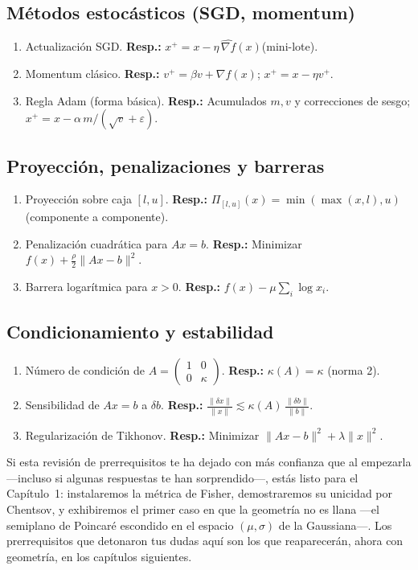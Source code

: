 	\subsection*{Métodos estocásticos (SGD, momentum)}
	\begin{enumerate}
		\item Actualización SGD. \textbf{Resp.:} $x^{+}=x-\eta\,\widehat{\nabla f}(x)$(mini-lote).
		\item Momentum clásico. \textbf{Resp.:} $v^{+}=\beta v+\nabla f(x)$; $x^{+}=x-\eta v^{+}$.
		\item Regla Adam (forma básica). \textbf{Resp.:} Acumulados $m,v$ y correcciones de sesgo; $x^{+}=x-\alpha\, m/ (\sqrt v+\varepsilon)$.
	\end{enumerate}
	
	\subsection*{Proyección, penalizaciones y barreras}
	\begin{enumerate}
		\item Proyección sobre caja $[l,u]$. \textbf{Resp.:} $\Pi_{[l,u]}(x)=\min(\max(x,l),u)$ (componente a componente).
		\item Penalización cuadrática para $Ax=b$. \textbf{Resp.:} Minimizar $f(x)+\tfrac{\rho}{2}\|Ax-b\|^2$.
		\item Barrera logarítmica para $x>0$. \textbf{Resp.:} $f(x)-\mu\sum_i \log x_i$.
	\end{enumerate}
	
	\subsection*{Condicionamiento y estabilidad}
	\begin{enumerate}
		\item Número de condición de $A=\begin{pmatrix}1&0\\0&\kappa\end{pmatrix}$. \textbf{Resp.:} $\kappa(A)=\kappa$ (norma 2).
		\item Sensibilidad de $Ax=b$ a $\delta b$. \textbf{Resp.:} $\frac{\|\delta x\|}{\|x\|}\lesssim \kappa(A)\,\frac{\|\delta b\|}{\|b\|}$.
		\item Regularización de Tikhonov. \textbf{Resp.:} Minimizar $\|Ax-b\|^2+\lambda\|x\|^2$.
	\end{enumerate}


	\bigskip
	\noindent
	Si esta revisión de prerrequisitos te ha dejado con más confianza que al empezarla ---incluso si algunas respuestas te han sorprendido---, estás listo para el Capítulo~1: instalaremos la métrica de Fisher, demostraremos su unicidad por Chentsov, y exhibiremos el primer caso en que la geometría no es llana ---el semiplano de Poincaré escondido en el espacio $(\mu,\sigma)$ de la Gaussiana---. Los prerrequisitos que detonaron tus dudas aquí son los que reaparecerán, ahora con geometría, en los capítulos siguientes.

